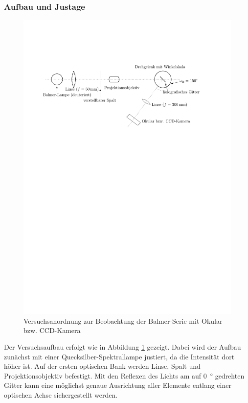 \documentclass[11pt, a4paper]{article}
\numberwithin{equation}{section}
\begin{document}
\subsubsection{Aufbau und Justage}
\label{sssec:balmer_okular}
\begin{figure}[h]
\centering
\includegraphics[width=\textwidth]{./figures/versuchsaufbau_balmerserie.pdf}
\caption{Versuchsanordnung zur Beobachtung der Balmer-Serie mit Okular bzw. CCD-Kamera}
\label{fig:aufbau_balmer}
\end{figure}
\noindent Der Versuchsaufbau erfolgt wie in Abbildung \ref{fig:aufbau_balmer} gezeigt.
Dabei wird der Aufbau zunächst mit einer Quecksilber-Spektrallampe justiert, da die Intensität dort höher ist.
Auf der ersten optischen Bank werden Linse, Spalt und Projektionsobjektiv befestigt.
Mit den Reflexen des Lichts am auf \SI{0}{\degree} gedrehten Gitter kann eine möglichst genaue Ausrichtung aller Elemente entlang einer optischen Achse sichergestellt werden.
\end{document}
